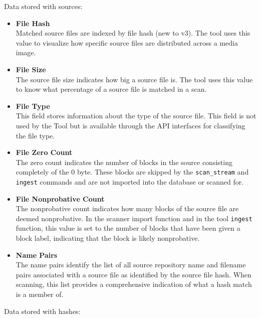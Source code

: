 \documentclass[11pt,fleqn]{article} %
\begin{document}
Data stored with sources:
\begin{itemize}
\item \textbf{File Hash}\\
Matched source files are indexed by file hash (new to \hdb v3). The \sscope tool uses this value to visualize how specific source files are distributed across a media image.
\item \textbf{File Size}\\
The source file size indicates how big a source file is. The \sscope tool uses this value to know what percentage of a source file is matched in a scan.
\item \textbf{File Type}\\
This field stores information about the type of the source file. This field is not used by the \hdb Tool but is available through the \hdb API interfaces for classifying the file type.
\item \textbf{File Zero Count}\\
The zero count indicates the number of blocks in the source consisting completely of the 0 byte.  These blocks are skipped by the \hdb \verb+scan_stream+ and \verb+ingest+ commands and are not imported into the database or scanned for.
\item \textbf{File Nonprobative Count}\\
The nonprobative count indicates how many blocks of the source file are deemed nonprobative. In the \bulk \hdb scanner import function and in the \hdb tool \verb+ingest+ function, this value is set to the number of blocks that have been given a block label, indicating that the block is likely nonprobative.
\item \textbf{Name Pairs}\\
The name pairs identify the list of all source repository name and filename pairs associated with a source file as identified by the source file hash. When scanning, this list provides a comprehensive indication of what a hash match is a member of.
\end{itemize}
Data stored with hashes:
\end{document}
